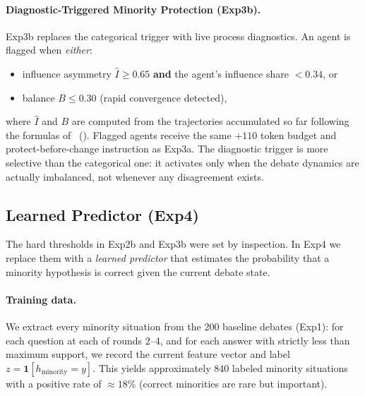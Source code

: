 \paragraph{Diagnostic-Triggered Minority Protection (Exp3b).}
Exp3b replaces the categorical trigger with live process diagnostics.
An agent is flagged when \emph{either}:
\begin{itemize}[noitemsep,topsep=2pt]
  \item influence asymmetry $\hat{I}\!\geq\!0.65$
        \textbf{and} the agent's influence share $<\!0.34$, or
  \item balance $B\!\leq\!0.30$ (rapid convergence detected),
\end{itemize}
where $\hat{I}$ and $B$ are computed from the trajectories accumulated so
far following the formulas of \citeauthor{diagnostic2026}~(\citeyear{diagnostic2026}).
Flagged agents receive the same $+110$ token budget and protect-before-change
instruction as Exp3a.
The diagnostic trigger is more selective than the categorical one: it
activates only when the debate dynamics are actually imbalanced, not
whenever any disagreement exists.

\subsection{Learned Predictor (Exp4)}
\label{sec:predictor}

The hard thresholds in Exp2b and Exp3b were set by inspection.
In Exp4 we replace them with a \emph{learned predictor} that estimates the
probability that a minority hypothesis is correct given the current debate
state.

\paragraph{Training data.}
We extract every minority situation from the 200 baseline debates (Exp1):
for each question at each of rounds 2--4, and for each answer with strictly
less than maximum support, we record the current feature vector and label
$z=\mathbf{1}[h_{\mathrm{minority}}=y]$.
This yields approximately 840 labeled minority situations with a positive
rate of $\approx\!18\%$ (correct minorities are rare but important).

